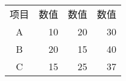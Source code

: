 \begin{table}[htbp]
  \centering
  \begin{tabular}{crrr}
  \rowcolor{black!30} %
    项目 & 数值 & 数值 & 数值 \\
    A & 10 & 20 & 30 \\
    B & 20 & 15 & 40 \\
    C & 15 & 25 & 37
  \end{tabular}
\end{table}
